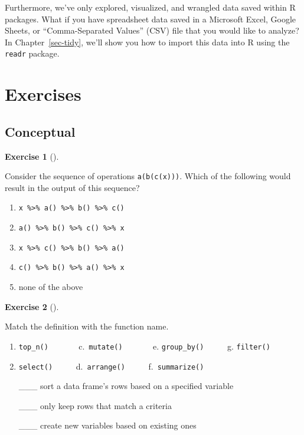 \documentclass[
  letterpaper,
  DIV=11,
  numbers=noendperiod]{scrreprt}
\providecommand{\tightlist}{%
  \setlength{\itemsep}{0pt}\setlength{\parskip}{0pt}}\usepackage{longtable,booktabs,array}
\theoremstyle{definition}
\newtheorem{exercise}{Exercise}[chapter]
\theoremstyle{remark}
\begin{document}
Furthermore, we've only explored, visualized, and wrangled data saved
within R packages. What if you have spreadsheet data saved in a
Microsoft Excel, Google Sheets, or ``Comma-Separated Values'' (CSV) file
that you would like to analyze? In Chapter~\ref{sec-tidy}, we'll show
you how to import this data into R using the \texttt{readr} package.

\hypertarget{sec-ex03}{%
\section{Exercises}\label{sec-ex03}}

\hypertarget{sec-ex03-conceptual}{%
\subsection{Conceptual}\label{sec-ex03-conceptual}}

\begin{exercise}[]\protect\hypertarget{exr-ch03-c01}{}\label{exr-ch03-c01}

Consider the sequence of operations \texttt{a(b(c(x)))}. Which of the
following would result in the output of this sequence?

\begin{enumerate}
\def\labelenumi{\alph{enumi})}
\tightlist
\item
  \texttt{x\ \%\textgreater{}\%\ a()\ \%\textgreater{}\%\ b()\ \%\textgreater{}\%\ c()}
\item
  \texttt{a()\ \%\textgreater{}\%\ b()\ \%\textgreater{}\%\ c()\ \%\textgreater{}\%\ x}
\item
  \texttt{x\ \%\textgreater{}\%\ c()\ \%\textgreater{}\%\ b()\ \%\textgreater{}\%\ a()}
\item
  \texttt{c()\ \%\textgreater{}\%\ b()\ \%\textgreater{}\%\ a()\ \%\textgreater{}\%\ x}
\item
  none of the above
\end{enumerate}

\end{exercise}

\begin{exercise}[]\protect\hypertarget{exr-ch03-c02}{}\label{exr-ch03-c02}

Match the definition with the function name.

\begin{enumerate}
\def\labelenumi{\alph{enumi})}
\item
  \texttt{top\_n()} ~ ~ ~ ~ c.~\texttt{mutate()} ~ ~ ~ ~ e.
  \texttt{group\_by()} ~ ~ ~ g. \texttt{filter()}
\item
  \texttt{select()} ~ ~ ~ d.~\texttt{arrange()} ~ ~ ~
  f.~\texttt{summarize()}

  \_\_\_ sort a data frame's rows based on a specified variable

  \_\_\_ only keep rows that match a criteria

  \_\_\_ create new variables based on existing ones
\end{enumerate}

\end{exercise}
\end{document}
